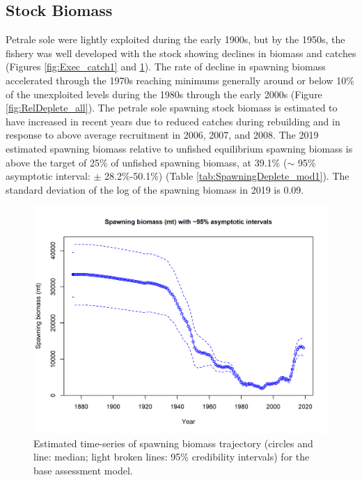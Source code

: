 \documentclass[12pt,]{article}
\begin{document}
\subsection*{Stock Biomass}\label{stock-biomass}

Petrale sole were lightly exploited during the early 1900s, but by the
1950s, the fishery was well developed with the stock showing declines in
biomass and catches (Figures \ref{fig:Exec_catch1} and
\ref{fig:Spawnbio_all}). The rate of decline in spawning biomass
accelerated through the 1970s reaching minimums generally around or
below 10\% of the unexploited levels during the 1980s through the early
2000s (Figure \ref{fig:RelDeplete_all}). The petrale sole spawning stock
biomass is estimated to have increased in recent years due to reduced
catches during rebuilding and in response to above average recruitment
in 2006, 2007, and 2008. The 2019 estimated spawning biomass relative to
unfished equilibrium spawning biomass is above the target of 25\% of
unfished spawning biomass, at 39.1\% (\(\sim\) 95\% asymptotic interval:
\(\pm\) 28.2\%-50.1\%) (Table \ref{tab:SpawningDeplete_mod1}). The
standard deviation of the log of the spawning biomass in 2019 is 0.09.

\begin{figure}
\centering
\includegraphics{r4ss/plots_mod1/ts7_Spawning_biomass_(mt)_with_95_asymptotic_intervals_intervals.png}
\caption{Estimated time-series of spawning biomass trajectory (circles
and line: median; light broken lines: 95\% credibility intervals) for
the base assessment model. \label{fig:Spawnbio_all}}
\end{figure}
\end{document}
